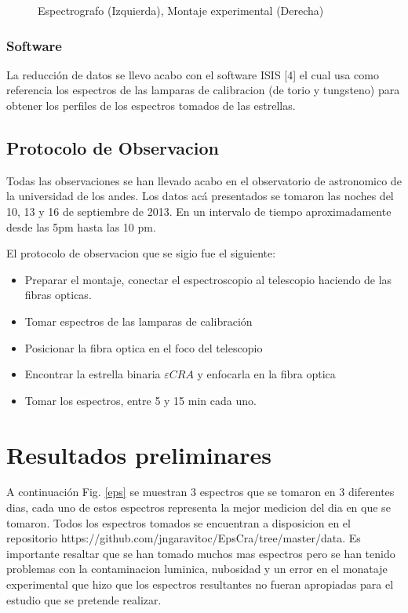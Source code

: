 \documentclass[Proceedings]{ascelike}
\begin{document}
\begin{figure}
\caption{Espectrografo (Izquierda), Montaje experimental (Derecha) \label{espectrografo}}
\end{figure}



\subsubsection{Software}

La reducci\'on de datos se llevo acabo con el software ISIS [4]
el cual usa como referencia los espectros de las lamparas de calibracion (de torio y tungsteno)
para obtener los perfiles de los espectros tomados de las estrellas.

\subsection{Protocolo de Observacion}

Todas las observaciones se han llevado acabo en el observatorio de astronomico
de la universidad de los andes. Los datos ac\'a presentados se tomaron las noches
del 10, 13 y 16 de septiembre de 2013. En un intervalo de tiempo aproximadamente 
desde las 5pm hasta las 10 pm. 

El protocolo de observacion que se sigio fue el siguiente:

\begin{itemize}
\item Preparar el montaje, conectar el espectroscopio al telescopio haciendo de las 
fibras opticas.
\item Tomar espectros de las lamparas de calibraci\'on 
\item Posicionar la fibra optica en el foco del telescopio
\item Encontrar la estrella binaria $\varepsilon CRA$ y enfocarla en la fibra optica
\item Tomar los espectros, entre 5 y 15 min cada uno.
\end{itemize}

\section{Resultados preliminares}

A continuaci\'on Fig. \ref{eps} se muestran 3 espectros que se tomaron en 3 diferentes dias, cada uno de 
estos espectros representa la mejor medicion del dia en que se tomaron. Todos los espectros
tomados se encuentran a disposicion en el repositorio https://github.com/jngaravitoc/EpsCra/tree/master/data.
Es importante resaltar que se han tomado muchos mas espectros pero se han tenido problemas con la contaminacion 
luminica, nubosidad y un error en el monataje experimental que hizo que los espectros resultantes no fueran 
apropiadas para el estudio que se pretende realizar.
\end{document}
